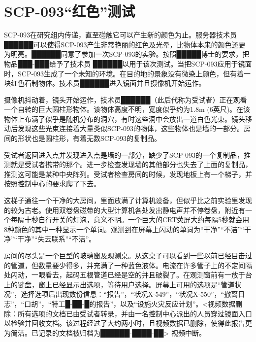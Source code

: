 \section{SCP-093“红色”测试}

\label{sec:DOC-scp-093-red-test}


\begin{scpbox}

SCP-093在研究组内传递，直至碰触它可以产生新的颜色为止。服务器技术员██████可以使得SCP-093产生非常艳丽的红色及光晕，比物体本来的颜色还更为明亮。██████同意了参加一次SCP-093的实验。按照█████博士的要求，把物品███-███给予了技术员 ██████以用于该次测试。当把SCP-093应用于镜面时，SCP-093生成了一个未知的环境。在目的地的景象没有微染上颜色，但有着一块红色石制物体。技术员██████进入镜面并且摄像机开始运作。

摄像机抖动着，镜头开始运作，技术员██████（此后代称为受试者）正在观看一个自转的巨大圆柱形物体。该物体高度不明，宽度似乎约为1.8m (6英尺)。在该物体上布满了似乎是随机分布的洞穴，有时这些洞中会放出一道白色光束。镜头移动后发现这些光束连接着大量类似SCP-093的物体，这些物体也是墙的一部分。房间的形状也是圆柱形，有着无数SCP-093的复制品。

受试者返回进入点并发现进入点是墙的一部分，缺少了SCP-093的一个复制品，推测就是受试者携带的那个。进一步检查发现墙的其他部分也失去了上面的复制品，推测这可能是某种中央阵列。受试者检查房间的时候，发现地板上有一个梯子，并按照控制中心的要求爬了下去。

这梯子通往一个干净的大房间，里面放满了计算机设备，但似乎比之前实验里发现的较为古老。使用双卷盘磁带的大型计算机各处发出静电声并不停卷盘，附近有一个每隔十秒自行开关的灯泡，意义不明。一个巨大的CRT荧屏大约每隔5秒就会用8种颜色的其中一种显示一个单词。观测到在屏幕上闪动的单词为“干净”“不洁”“干净”“干净”“失去联系”“不洁”。

房间的尽头是一个巨型的玻璃窗及观测桌。从这桌子可以看到一些以前已经目击过的管道，但数量要少得多，并充满了一种蓝色液体。电流在许多管子上的不定间隔处闪动，一眼看去，起码五根管道已经是空的并且破裂了。在观测窗前有一放于台上的键盘，窗上已经显示出选项，等待用户选择。屏幕上可用的选项是“管道状况”，选择选项后出现数份信息：“报告”，“状况X-549”，“状况X-550”，“撤离日志”，“口胡”，“特工█-██-█的报告”，以及“设施火灾反应计划”。<视频数据删除：所有选项的文档已由受试者转录，并由一名控制中心派出的人员穿过镜面入口以检验并回收文档。该过程经过了大约两小时，且视频数据已删除，使得此报告更为简洁。已记录的文档被归档为██████-████-██> 视频中断。

\end{scpbox}

